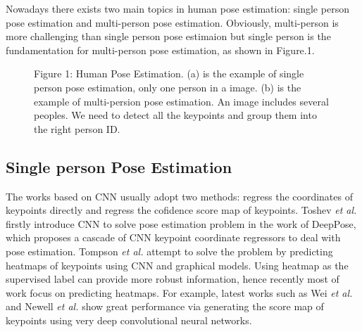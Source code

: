 Nowadays there exists two main topics in human pose estimation: single person pose estimation and multi-person pose estimation. Obviously, multi-person is more challenging than single person pose estimaion but single person is the fundamentation for multi-person pose estimation, as shown in Figure.1.

\captionsetup[figure]{labelformat=empty}
\begin{figure}
  \centering
  \hspace{1in}
  \caption{Figure 1: Human Pose Estimation. (a) is the example of single person pose estimation, only one person in a image. (b) is the example of multi-persion pose
  estimation. An image includes several peoples. We need to detect all the keypoints and group them into the right person ID.}
  \label{fig:1} %
\end{figure}

\subsection{Single person Pose Estimation}
The works based on CNN usually adopt two methods: regress the coordinates of keypoints directly and regress the cofidence score map of keypoints. Toshev \textit{et al.} firstly introduce
CNN to solve pose estimation problem in the work of DeepPose\cite{toshev2014deeppose}, which proposes a cascade of CNN keypoint coordinate regressors to deal with pose estimation. Tompson \textit{et al.}\cite{tompson2014joint}
attempt to solve the problem by predicting heatmaps of keypoints using CNN and graphical models.
Using heatmap as the supervised label can provide more robust information, hence recently most of work focus on predicting heatmaps.
For example, latest works such as Wei \textit{et al.}\cite{wei2016convolutional} and Newell \textit{et al.}\cite{newell2016stacked} show great performance via generating the score map of keypoints using very
deep convolutional neural networks.

